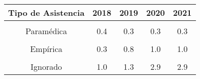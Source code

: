 \begin{tabular}[t]{ccccc}
\toprule
\textbf{Tipo de Asistencia} & \textbf{2018} & \textbf{2019} & \textbf{2020} & \textbf{2021}\\
\midrule
\cellcolor[HTML]{B6B3FF}{Médica} & \cellcolor[HTML]{B6B3FF}{71.6} & \cellcolor[HTML]{B6B3FF}{73.8} & \cellcolor[HTML]{B6B3FF}{68.9} & \cellcolor[HTML]{B6B3FF}{68.8}\\
Paramédica & 0.4 & 0.3 & 0.3 & 0.3\\
\cellcolor[HTML]{B6B3FF}{Comadrona} & \cellcolor[HTML]{B6B3FF}{26.6} & \cellcolor[HTML]{B6B3FF}{23.5} & \cellcolor[HTML]{B6B3FF}{26.6} & \cellcolor[HTML]{B6B3FF}{26.5}\\
Empírica & 0.3 & 0.8 & 1.0 & 1.0\\
\cellcolor[HTML]{B6B3FF}{Ninguna} & \cellcolor[HTML]{B6B3FF}{0.1} & \cellcolor[HTML]{B6B3FF}{0.3} & \cellcolor[HTML]{B6B3FF}{0.4} & \cellcolor[HTML]{B6B3FF}{0.4}\\
Ignorado & 1.0 & 1.3 & 2.9 & 2.9\\
\bottomrule
\end{tabular}
